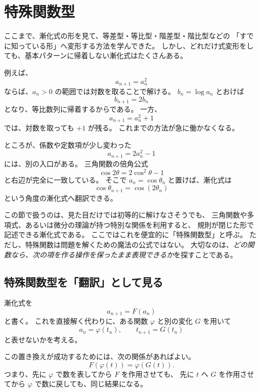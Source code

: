 
\section{特殊関数型}

ここまで、漸化式の形を見て、等差型・等比型・階差型・階比型などの
「すでに知っている形」へ変形する方法を学んできた。
しかし、どれだけ式変形をしても、基本パターンに帰着しない漸化式はたくさんある。

例えば、
\[
  a_{n+1}=a_n^2
\]
ならば、$a_n>0$ の範囲では対数を取ることで解ける。
$b_n=\log a_n$ とおけば
\[
  b_{n+1}=2b_n
\]
となり、等比数列に帰着するからである。
一方、
\[
  a_{n+1}=a_n^2+1
\]
では、対数を取っても $+1$ が残る。
これまでの方法が急に働かなくなる。

ところが、係数や定数項が少し変わった
\[
  a_{n+1}=2a_n^2-1
\]
には、別の入口がある。
三角関数の倍角公式
\[
  \cos 2\theta=2\cos^2\theta-1
\]
と右辺が完全に一致している。
そこで $a_n=\cos\theta_n$ と置けば、漸化式は
\[
  \cos\theta_{n+1}=\cos(2\theta_n)
\]
という角度の漸化式へ翻訳できる。

この節で扱うのは、見た目だけでは初等的に解けなさそうでも、
三角関数や多項式、あるいは微分の理論が持つ特別な関係を利用すると、
規則が閉じた形で記述できる漸化式である。
ここではこれを便宜的に「特殊関数型」と呼ぶ。
ただし、特殊関数は問題を解くための魔法の公式ではない。
大切なのは、\emph{どの関数なら、次の項を作る操作を保ったまま表現できるか}を探すことである。

\subsection{特殊関数型を「翻訳」として見る}

漸化式を
\[
  a_{n+1}=F(a_n)
\]
と書く。
これを直接解く代わりに、ある関数 $\varphi$ と別の変化 $G$ を用いて
\[
  a_n=\varphi(t_n),
  \qquad
  t_{n+1}=G(t_n)
\]
と表せないかを考える。

この置き換えが成功するためには、次の関係があればよい。
\[
  F(\varphi(t))=\varphi(G(t)) .
  \tag{2.7.1}
\]
つまり、先に $\varphi$ で数を表してから $F$ を作用させても、
先に $t$ へ $G$ を作用させてから $\varphi$ で数に戻しても、同じ結果になる。

